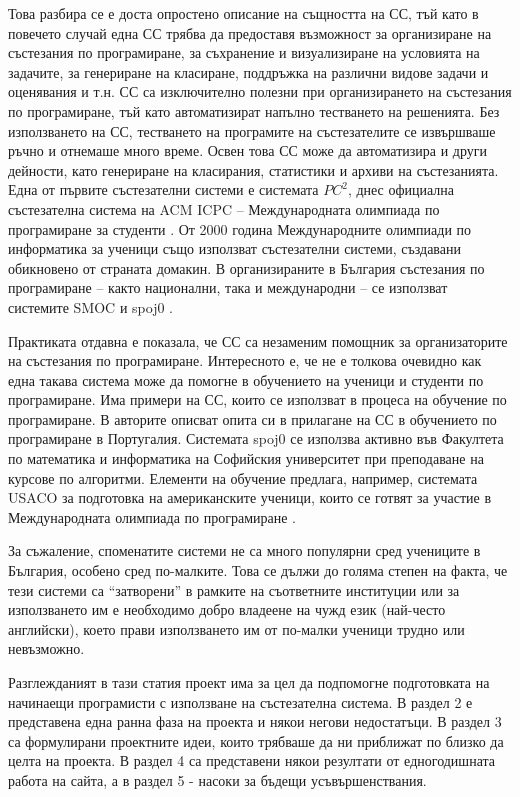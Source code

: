 \documentclass[a4paper,12pt]{article}
\begin{document}
    Това разбира се е доста опростено описание на същността на СС, тъй като в повечето случай една СС трябва да предоставя възможност за организиране на състезания по програмиране, за съхранение и визуализиране на условията на задачите, за генериране на класиране, поддръжка на различни видове задачи и оценявания и т.н. СС са изключително полезни при организирането на състезания по програмиране, тъй като автоматизират напълно тестването на решенията. Без използването на СС, тестването на програмите на състезателите се извършваше ръчно и отнемаше много време. Освен това СС може да автоматизира и други дейности, като генериране на класирания, статистики и архиви на състезанията. Една от първите състезателни системи е системата $PC^2$, днес официална състезателна система на ACM ICPC -- Международната олимпиада по програмиране за студенти \cite{pc2_home}. От 2000 година Международните олимпиади по информатика за ученици също използват състезателни системи, създавани обикновено от страната домакин. В организираните в България състезания по програмиране -- както национални, така и международни -- се използват системите SMOC \cite{smoc_system} и spoj0 \cite{spoj0_train}. 
 
    Практиката отдавна е показала, че СС са незаменим помощник за организаторите на състезания по програмиране. Интересното е, че не е толкова очевидно как една такава система може да помогне в обучението на ученици и студенти по програмиране. Има примери на СС, които се използват в процеса на обучение по програмиране. В \cite{intro_ribeiro} авторите описват опита си в прилагане на СС в обучението по програмиране в Португалия. Системата spoj0 се използва активно във Факултета по математика и информатика на Софийския университет при преподаване на курсове по алгоритми. Елементи на обучение предлага, например, системата USACO за подготовка на американските ученици, които се готвят за участие в Международната олимпиада по програмиране \cite{usaco_training}. 
 
    За съжаление, споменатите системи не са много популярни сред учениците в България, особено сред по-малките. Това се дължи до голяма степен на факта, че тези системи са ``затворени'' в рамките на съответните институции или за използването им е необходимо добро владеене на чужд език (най-често английски), което прави използването им от по-малки ученици трудно или невъзможно. 
 
    Разглежданият в тази статия проект има за цел да подпомогне подготовката на начинаещи програмисти с използване на състезателна система. В раздел 2 е представена една ранна фаза на проекта и някои негови недостатъци. В раздел 3 са формулирани проектните идеи, които трябваше да ни приближат по близко да целта на проекта. В раздел 4 са представени някои резултати от едногодишната работа на сайта, а в раздел 5 - насоки за бъдещи усъвършенствания.
    
\end{document}
